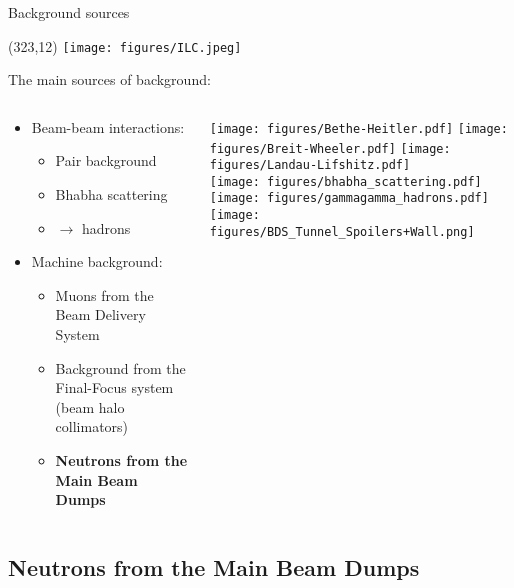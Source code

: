 \documentclass[xcolor={dvipsnames}]{beamer}
\newcommand{\ilclogo}{
  \setlength{\TPHorizModule}{1pt}
  \setlength{\TPVertModule}{1pt}
  \begin{textblock}{1}(323,12)
   \texttt{[image: figures/ILC.jpeg]}
  \end{textblock}
}
\begin{document}
\begin{frame}{Background sources}
\ilclogo
The main sources of background:
\begin{columns}
 \begin{column}{0.6\textwidth}
  \begin{itemize}
    \item Beam-beam interactions:
    \begin{itemize}
      \item Pair background
      \item Bhabha scattering
      \item \textgamma \textgamma $\rightarrow$ hadrons
    \end{itemize}
    \vspace*{0.5cm}
    \item Machine background:
    \begin{itemize}
      \item Muons from the Beam Delivery System
      \item Background from the Final-Focus system (beam halo collimators)
      \item \textbf{Neutrons from the Main Beam Dumps}
    \end{itemize}
  \end{itemize}
 \end{column}
 \begin{column}{0.45\textwidth}
 \texttt{[image: figures/Bethe-Heitler.pdf]}
 \texttt{[image: figures/Breit-Wheeler.pdf]}
 \texttt{[image: figures/Landau-Lifshitz.pdf]}\\
 \texttt{[image: figures/bhabha\_scattering.pdf]} 
 \texttt{[image: figures/gammagamma\_hadrons.pdf]}\\
 \vspace*{0.5cm}
 \texttt{[image: figures/BDS\_Tunnel\_Spoilers+Wall.png]}
 \end{column}
\end{columns}
\end{frame}

\subsection{Neutrons from the Main Beam Dumps}
\end{document}
